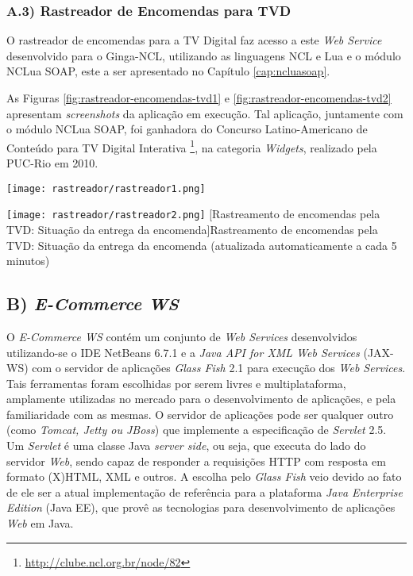 \subsubsection*{A.3) Rastreador de Encomendas para TVD}

O rastreador de encomendas para a TV Digital faz acesso a este \textit{Web Service} desenvolvido
para o Ginga-NCL, utilizando as linguagens NCL e Lua e o módulo NCLua SOAP, este a ser apresentado no Capítulo \ref{cap:ncluasoap}.

As Figuras \ref{fig:rastreador-encomendas-tvd1} e \ref{fig:rastreador-encomendas-tvd2} apresentam \textit{screenshots} da aplicação em execução.
Tal aplicação, juntamente com o módulo NCLua SOAP, foi ganhadora do Concurso Latino-Americano de Conteúdo para TV Digital Interativa
\footnote{\url{http://clube.ncl.org.br/node/82}},
na categoria \textit{Widgets}, realizado pela PUC-Rio em 2010.

\begin{center}
	\texttt{[image: rastreador/rastreador1.png]}
	\label{fig:rastreador-encomendas-tvd1}
\end{center}

\begin{center}
	\texttt{[image: rastreador/rastreador2.png]}
	[Rastreamento de encomendas pela TVD: Situação da entrega da encomenda]{Rastreamento de encomendas pela TVD: Situação da entrega da encomenda (atualizada automaticamente a cada 5 minutos)}
	\label{fig:rastreador-encomendas-tvd2}
\end{center}

\subsection*{B) \textit{E-Commerce WS}}

O \textit{E-Commerce WS} contém um conjunto de \textit{Web Services} desenvolvidos utilizando-se o IDE NetBeans 6.7.1 e a  \textit{Java API for XML Web Services} (JAX-WS)
com o servidor de aplicações \textit{Glass Fish} 2.1 para execução dos \textit{Web Services}.
Tais ferramentas foram escolhidas por serem livres e multiplataforma,
amplamente utilizadas no mercado para o desenvolvimento de aplicações,
e pela familiaridade com as mesmas. O servidor de aplicações pode
ser qualquer outro (como \textit{Tomcat, Jetty ou JBoss}) que implemente a especificação de \textit{Servlet} 2.5.
Um \textit{Servlet} é uma classe Java \textit{server side}, ou seja, que executa
do lado do servidor \textit{Web}, sendo capaz de responder a requisições
HTTP com resposta em formato (X)HTML, XML e outros.
A escolha pelo \textit{Glass Fish} veio devido ao fato de ele ser a atual implementação
de referência para a plataforma \textit{Java Enterprise Edition} (Java EE), que provê as
tecnologias para desenvolvimento de aplicações \textit{Web} em Java.

